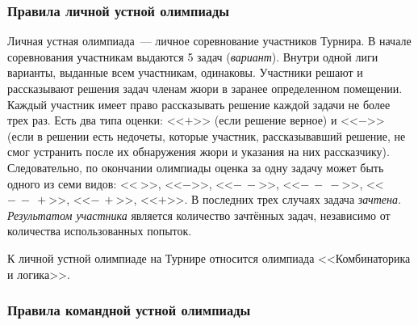 \subsubsection*{Правила личной устной олимпиады}

Личная устная олимпиада~---
личное соревнование участников Турнира.
В начале соревнования участникам выдаются 5 задач (\emph{вариант}).
Внутри одной лиги варианты, выданные всем участникам, одинаковы.
Участники решают и рассказывают решения задач членам жюри в заранее
определенном помещении.
Каждый участник имеет право рассказывать решение каждой задачи не более трех
раз.
Есть два типа оценки:
<<$+$>>
(если решение верное)
и <<$-$>>
(если в решении есть недочеты, которые участник, рассказывавший решение, не
смог устранить после их обнаружения жюри и указания на них рассказчику).
Следовательно, по окончании олимпиады оценка за одну задачу может быть одного
из семи видов:
<<$\ $>>,
<<$-$>>,
<<$-\ -$>>,
<<$-\ -\ -$>>,
<<$-\ -\ +$>>,
<<$-\ +$>>,
<<$+$>>.
В последних трех случаях задача \emph{зачтена}.
\emph{Результатом участника} является количество зачтённых задач, независимо от
количества использованных попыток.

К личной устной олимпиаде на Турнире относится олимпиада
<<Комбинаторика и логика>>.

\subsubsection*{Правила командной устной олимпиады}

